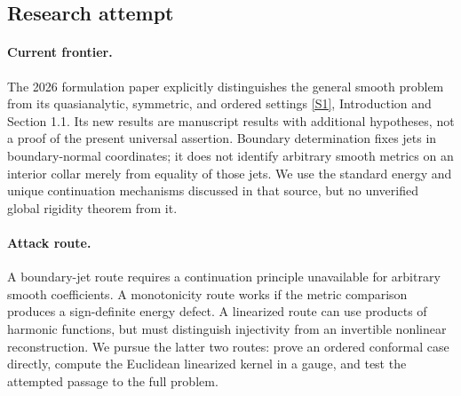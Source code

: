 \documentclass[11pt,a4paper]{article}
\newcommand{\sref}[2]{\hyperlink{source:#1:#2}{[S#2]}}
\numberwithin{equation}{section}
\begin{document}
\subsection{Research attempt}

\paragraph{Current frontier.}
The 2026 formulation paper explicitly distinguishes the general smooth
problem from its quasianalytic, symmetric, and ordered settings
\sref{176}{1}, Introduction and Section 1.1. Its new results are manuscript
results with additional hypotheses, not a proof of the present universal
assertion. Boundary determination fixes jets in boundary-normal coordinates;
it does not identify arbitrary smooth metrics on an interior collar merely
from equality of those jets. We use the standard energy and unique
continuation mechanisms discussed in that source, but no unverified global
rigidity theorem from it.

\paragraph{Attack route.}
A boundary-jet route requires a continuation principle unavailable for
arbitrary smooth coefficients. A monotonicity route works if the metric
comparison produces a sign-definite energy defect. A linearized route can
use products of harmonic functions, but must distinguish injectivity from
an invertible nonlinear reconstruction. We pursue the latter two routes:
prove an ordered conformal case directly, compute the Euclidean linearized
kernel in a gauge, and test the attempted passage to the full problem.
\end{document}
